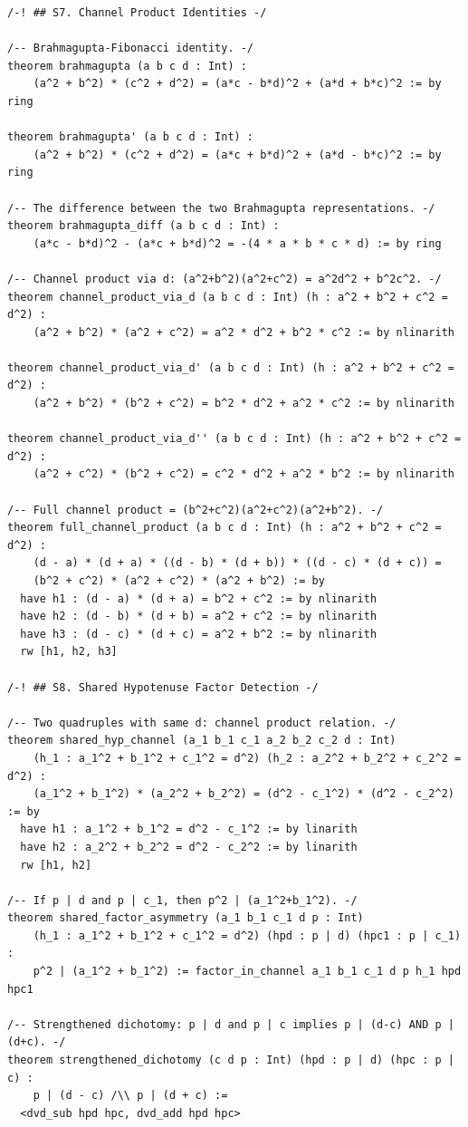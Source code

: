 \documentclass[11pt,openright,twoside]{book}
\theoremstyle{definition}
\begin{document}
\begin{lstlisting}[style=lean]
/-! ## S7. Channel Product Identities -/

/-- Brahmagupta-Fibonacci identity. -/
theorem brahmagupta (a b c d : Int) :
    (a^2 + b^2) * (c^2 + d^2) = (a*c - b*d)^2 + (a*d + b*c)^2 := by ring

theorem brahmagupta' (a b c d : Int) :
    (a^2 + b^2) * (c^2 + d^2) = (a*c + b*d)^2 + (a*d - b*c)^2 := by ring

/-- The difference between the two Brahmagupta representations. -/
theorem brahmagupta_diff (a b c d : Int) :
    (a*c - b*d)^2 - (a*c + b*d)^2 = -(4 * a * b * c * d) := by ring

/-- Channel product via d: (a^2+b^2)(a^2+c^2) = a^2d^2 + b^2c^2. -/
theorem channel_product_via_d (a b c d : Int) (h : a^2 + b^2 + c^2 = d^2) :
    (a^2 + b^2) * (a^2 + c^2) = a^2 * d^2 + b^2 * c^2 := by nlinarith

theorem channel_product_via_d' (a b c d : Int) (h : a^2 + b^2 + c^2 = d^2) :
    (a^2 + b^2) * (b^2 + c^2) = b^2 * d^2 + a^2 * c^2 := by nlinarith

theorem channel_product_via_d'' (a b c d : Int) (h : a^2 + b^2 + c^2 = d^2) :
    (a^2 + c^2) * (b^2 + c^2) = c^2 * d^2 + a^2 * b^2 := by nlinarith

/-- Full channel product = (b^2+c^2)(a^2+c^2)(a^2+b^2). -/
theorem full_channel_product (a b c d : Int) (h : a^2 + b^2 + c^2 = d^2) :
    (d - a) * (d + a) * ((d - b) * (d + b)) * ((d - c) * (d + c)) =
    (b^2 + c^2) * (a^2 + c^2) * (a^2 + b^2) := by
  have h1 : (d - a) * (d + a) = b^2 + c^2 := by nlinarith
  have h2 : (d - b) * (d + b) = a^2 + c^2 := by nlinarith
  have h3 : (d - c) * (d + c) = a^2 + b^2 := by nlinarith
  rw [h1, h2, h3]

/-! ## S8. Shared Hypotenuse Factor Detection -/

/-- Two quadruples with same d: channel product relation. -/
theorem shared_hyp_channel (a_1 b_1 c_1 a_2 b_2 c_2 d : Int)
    (h_1 : a_1^2 + b_1^2 + c_1^2 = d^2) (h_2 : a_2^2 + b_2^2 + c_2^2 = d^2) :
    (a_1^2 + b_1^2) * (a_2^2 + b_2^2) = (d^2 - c_1^2) * (d^2 - c_2^2) := by
  have h1 : a_1^2 + b_1^2 = d^2 - c_1^2 := by linarith
  have h2 : a_2^2 + b_2^2 = d^2 - c_2^2 := by linarith
  rw [h1, h2]

/-- If p | d and p | c_1, then p^2 | (a_1^2+b_1^2). -/
theorem shared_factor_asymmetry (a_1 b_1 c_1 d p : Int)
    (h_1 : a_1^2 + b_1^2 + c_1^2 = d^2) (hpd : p | d) (hpc1 : p | c_1) :
    p^2 | (a_1^2 + b_1^2) := factor_in_channel a_1 b_1 c_1 d p h_1 hpd hpc1

/-- Strengthened dichotomy: p | d and p | c implies p | (d-c) AND p | (d+c). -/
theorem strengthened_dichotomy (c d p : Int) (hpd : p | d) (hpc : p | c) :
    p | (d - c) /\\ p | (d + c) :=
  <dvd_sub hpd hpc, dvd_add hpd hpc>


\end{lstlisting}
\end{document}
